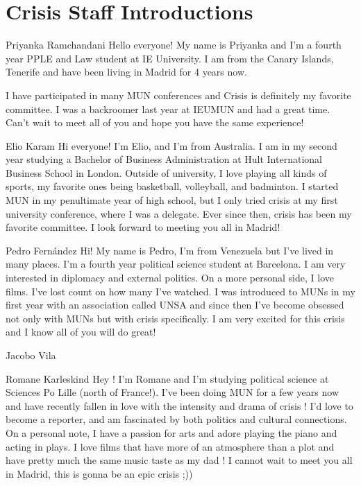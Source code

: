 \section{Crisis Staff Introductions}

\begin{chairletter}[Chair]{Priyanka Ramchandani}
Hello everyone! My name is Priyanka and I’m a fourth year PPLE and Law student at IE University. I am from the Canary Islands, Tenerife and have been living in Madrid for 4 years now.

I have participated in many MUN conferences and Crisis is definitely my favorite committee. I was a backroomer last year at IEUMUN and had a great time. Can’t wait to meet all of you and hope you have the same experience!

\end{chairletter}

\begin{chairletter}[Co-Chair]{Elio Karam}
Hi everyone! I’m Elio, and I’m from Australia. I am in my second year studying a Bachelor of Business Administration at Hult International Business School in London. Outside of university, I love playing all kinds of sports, my favorite ones being basketball, volleyball, and badminton. I started MUN in my penultimate year of high school, but I only tried crisis at my first university conference, where I was a delegate. Ever since then, crisis has been my favorite committee. I look forward to meeting you all in Madrid!

\end{chairletter}

\begin{chairletter}{Pedro Fernández}
Hi! My name is Pedro, I’m from Venezuela but I’ve lived in many places. I'm a fourth year political science student at Barcelona. I am very interested in diplomacy and external politics. On a more personal side, I love films. I've lost count on how many I’ve watched. I was introduced to MUNs in my first year with an association called UNSA and since then I’ve become obsessed not only with MUNs but with crisis specifically. I am very excited for this crisis and I know all of you will do great!

\end{chairletter}

\begin{chairletter}{Jacobo Vila}
\end{chairletter}

\begin{chairletter}{Romane Karleskind}
Hey ! I’m Romane and I’m studying political science at Sciences Po Lille (north of France!). I’ve been doing MUN for a few years now and have recently fallen in love with the intensity and drama of crisis ! I’d love to become a reporter, and am fascinated by both politics and cultural connections. On a personal note, I have a passion for arts and adore playing the piano and acting in plays. I love films that have more of an atmosphere than a plot and have pretty much the same music taste as my dad ! I cannot wait to meet you all in Madrid, this is gonna be an epic crisis ;))

\end{chairletter}
